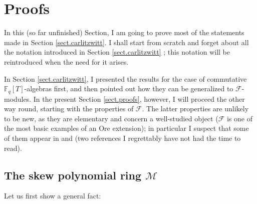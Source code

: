 \documentclass[numbers=enddot,12pt,final,onecolumn,notitlepage]{scrartcl}%
\theoremstyle{definition}
\begin{document}
\section{\label{sect.proofs}Proofs}

In this (so far unfinished) Section, I am going to prove most of the
statements made in Section \ref{sect.carlitzwitt}. I shall start from scratch
and forget about all the notation introduced in Section \ref{sect.carlitzwitt}%
; this notation will be reintroduced when the need for it arises.

In Section \ref{sect.carlitzwitt}, I presented the results for the case of
commutative $\mathbb{F}_{q}\left[  T\right]  $-algebras first, and then
pointed out how they can be generalized to $\mathcal{F}$-modules. In the
present Section \ref{sect.proofs}, however, I will proceed the other way
round, starting with the properties of $\mathcal{F}$. The latter properties
are unlikely to be new, as they are elementary and concern a well-studied
object ($\mathcal{F}$ is one of the most basic examples of an Ore extension);
in particular I suspect that some of them appear in \cite{ore-pp1} and
\cite{ore-pp2} (two references I regrettably have not had the time to read).

\subsection{The skew polynomial ring $\mathcal{M}$}

Let us first show a general fact:
\end{document}
